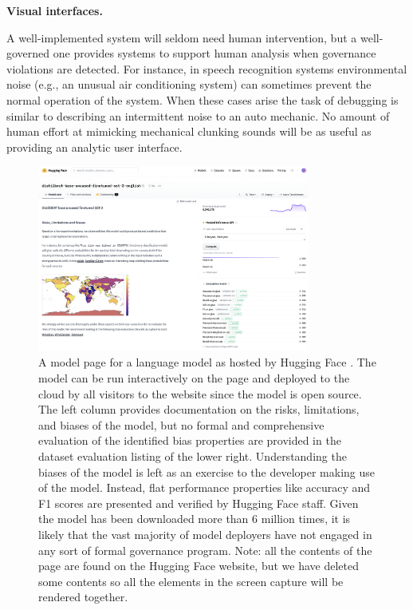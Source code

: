 \textbf{Visual interfaces.}

A well-implemented system will seldom need human intervention, but a well-governed one provides systems to support human analysis when governance violations are detected. For instance, in speech recognition systems environmental noise (e.g., an unusual air conditioning system) can sometimes prevent the normal operation of the system. When these cases arise the task of debugging is similar to describing an intermittent noise to an auto mechanic. No amount of human effort at mimicking mechanical clunking sounds will be as useful as providing an analytic user interface.

\begin{figure}[ht]
    \centering
    \includegraphics[width=0.8\textwidth]{images/huggingface.png}
    \caption{A model page for a language model as hosted by Hugging Face \cite{hugging_face_distilbert-base-uncased-finetuned-sst-2-english_2022}. The model can be run interactively on the page and deployed to the cloud by all visitors to the website since the model is open source. The left column provides documentation on the risks, limitations, and biases of the model, but no formal and comprehensive evaluation of the identified bias properties are provided in the dataset evaluation listing of the lower right. Understanding the biases of the model is left as an exercise to the developer making use of the model. Instead, flat performance properties like accuracy and F1 scores are presented and verified by Hugging Face staff. Given the model has been downloaded more than 6 million times, it is likely that the vast majority of model deployers have not engaged in any sort of formal governance program. Note: all the contents of the page are found on the Hugging Face website, but we have deleted some contents so all the elements in the screen capture will be rendered together.}
    \label{fig:huggingface}
\end{figure}

